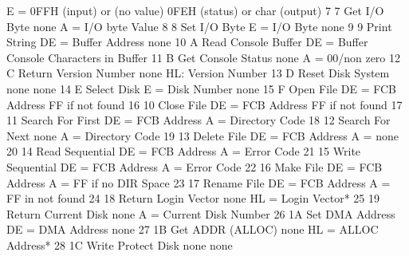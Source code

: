                                         E = 0FFH (input) or  (no value)
                                             0FEH (status) or
                                             char (output)
 7           7   Get I/O Byte            none                 A = I/O byte
                                                               Value
 8           8   Set I/O Byte            E = I/O Byte         none
 9           9   Print String            DE = Buffer Address  none
10           A   Read Console Buffer     DE = Buffer          Console
                                                               Characters
                                                               in Buffer
11           B   Get Console Status      none                 A = 00/non zero
12           C   Return Version Number   none                 HL: Version
                                                                 Number
13           D   Reset Disk System       none                   none
14           E   Select Disk             E = Disk Number        none
15           F   Open File               DE = FCB Address       FF if not found
16          10   Close File              DE = FCB Address       FF if not found
17          11   Search For First        DE = FCB Address       A = Directory
                                                                  Code
18          12   Search For Next         none                   A = Directory
                                                                  Code
19          13   Delete File             DE = FCB Address       A = none
20          14   Read Sequential         DE = FCB Address       A = Error Code
21          15   Write Sequential        DE = FCB Address       A = Error Code
22          16   Make File               DE = FCB Address       A = FF if no DIR
                                                                  Space
23          17   Rename File             DE = FCB Address       A = FF in not
                                                                  found
24          18   Return Login Vector     none                   HL = Login
                                                                   Vector*
25          19   Return Current Disk     none                   A = Current Disk
                                                                  Number
26          1A   Set DMA Address         DE = DMA Address       none
27          1B   Get ADDR (ALLOC)        none                   HL = ALLOC
                                                                   Address*
28          1C   Write Protect Disk      none                   none
